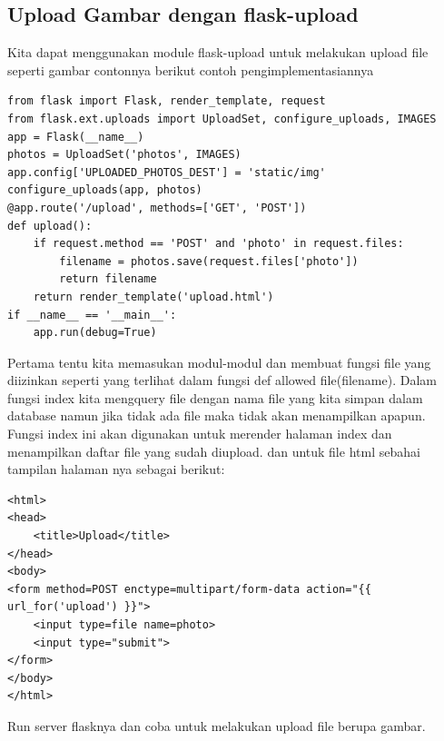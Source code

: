 \subsection{Upload Gambar dengan flask-upload}
Kita dapat menggunakan module flask-upload untuk melakukan upload file seperti gambar contonnya berikut contoh pengimplementasiannya
\begin{verbatim}
from flask import Flask, render_template, request
from flask.ext.uploads import UploadSet, configure_uploads, IMAGES
app = Flask(__name__)
photos = UploadSet('photos', IMAGES)
app.config['UPLOADED_PHOTOS_DEST'] = 'static/img'
configure_uploads(app, photos)
@app.route('/upload', methods=['GET', 'POST'])
def upload():
    if request.method == 'POST' and 'photo' in request.files:
        filename = photos.save(request.files['photo'])
        return filename
    return render_template('upload.html')
if __name__ == '__main__':
    app.run(debug=True)
\end{verbatim}
Pertama tentu kita memasukan modul-modul dan membuat fungsi file yang diizinkan seperti yang terlihat dalam fungsi def allowed file(filename). Dalam fungsi index kita mengquery file dengan nama file yang kita simpan dalam database namun jika tidak ada file maka tidak akan menampilkan apapun. Fungsi index ini akan digunakan untuk merender halaman index dan menampilkan daftar file yang sudah diupload.
dan untuk file html sebahai tampilan halaman nya sebagai berikut:
\begin{verbatim}
<html>
<head>
    <title>Upload</title>
</head>
<body>
<form method=POST enctype=multipart/form-data action="{{ url_for('upload') }}">
    <input type=file name=photo>
    <input type="submit">
</form>
</body>
</html>
\end{verbatim}
Run server flasknya dan coba untuk melakukan upload file berupa gambar.
